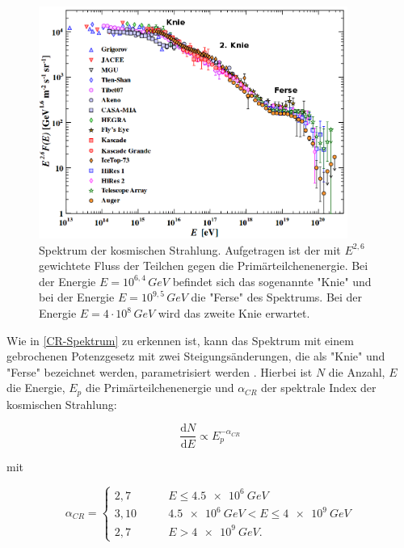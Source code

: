 \begin{figure}
    \centering
    \includegraphics[width=0.9\textwidth]{./Plots/02_Astroteilchenphysik/CosmicRaySpectrum2.png}
    \caption{Spektrum der kosmischen Strahlung. 
      Aufgetragen ist der mit $E^{2,6}$ gewichtete Fluss der Teilchen gegen die Primärteilchenenergie. 
      Bei der Energie $E=10^{6,4}\,\si{GeV}$ befindet sich das sogenannte "Knie" und bei der Energie $E=10^{9,5}\,\si{GeV}$ die "Ferse" des Spektrums. 
      Bei der Energie $E=4\cdot 10^8\,\si{GeV}$ \cite{Knie} wird das zweite Knie erwartet.\cite{PDG}}
    \label{CR-Spektrum}
\end{figure}



Wie in \autoref{CR-Spektrum} zu erkennen ist, kann das Spektrum mit einem gebrochenen Potenzgesetz mit zwei Steigungsänderungen, die als "Knie" und "Ferse" bezeichnet werden, parametrisiert werden \cite{Knie}.
Hierbei ist $N$ die Anzahl, $E$ die Energie, $E_p$ die Primärteilchenenergie und $\alpha_{CR}$ der spektrale Index der kosmischen Strahlung:

\begin{equation}
 \frac{\mathrm{d}N}{\mathrm{d}E} \propto E_p^{-\alpha_{CR}}
\end{equation}

mit \cite{Knie} 

\begin{equation*}
\alpha_{CR}=	
\left\{
\begin{aligned}
2,7 \qquad &E   \leq \SI{4,5e6}{GeV} \\
3,10 \qquad &  \SI{4,5e6}{GeV} < E  \leq \SI{4e9}{GeV} \\ 
2,7 \qquad & E > \SI{4e9}{GeV}.
\end{aligned}
\right.
\end{equation*}

